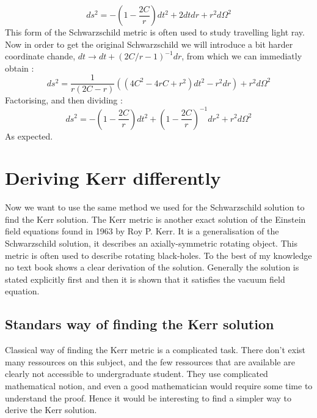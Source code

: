 \documentclass[a4paper,12pt]{article}
\theoremstyle{definition}
\begin{document}
\begin{equation}
	ds^2=-(1-\frac{2C}{r})dt^2+2dtdr+r^2d\Omega^2
\end{equation}
This form of the Schwarzschild metric is often used to study travelling light ray.
Now in order to get the original Schwarzschild we will introduce a bit harder coordinate chande, $dt\rightarrow dt+(2C/r-1)^{-1}dr$, from which we can immediatly obtain :
\begin{equation}
	ds^2=\frac{1}{r(2C-r)}((4C^2-4rC+r^2)dt^2-r^2dr)+r^2d\Omega^2
\end{equation}
Factorising, and then dividing :
\begin{equation}
	ds^2=-(1-\frac{2C}{r})dt^2+(1-\frac{2C}{r})^{-1}dr^2+r^2d\Omega^2
\end{equation}
As expected.

\section{Deriving Kerr differently}
Now we want to use the same method we used for the Schwarzschild solution to find the Kerr solution.
The Kerr metric is another exact solution of the Einstein field equations found in 1963 by Roy P. Kerr.
It is a generalisation of the Schwarzschild solution, it describes an axially-symmetric rotating object.
This metric is often used to describe rotating black-holes. To the best of my knowledge no text book shows a clear derivation of the solution.
Generally the solution is stated explicitly first and then it is shown that it satisfies the vacuum field equation.
\subsection{Standars way of finding the Kerr solution}
Classical way of finding the Kerr metric is a complicated task.
There don't exist many ressources on this subject, and the few ressources that are available are clearly not accessible to undergraduate student.
They use complicated mathematical notion, and even a good mathematician would require some time to understand the proof.
Hence it would be interesting to find a simpler way to derive the Kerr solution.
\end{document}
